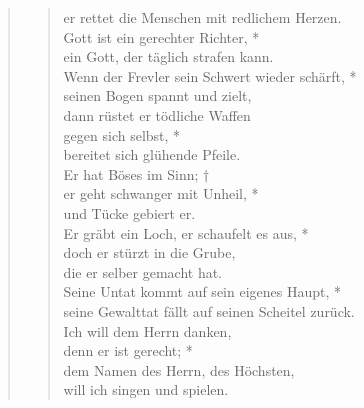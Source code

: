 \begin{quote}
\begin{verse}
er rettet die Menschen mit redlichem Herzen.\\
\vin Gott ist ein gerechter Richter, *\\
\vin ein Gott, der täglich strafen kann.\\
Wenn der Frevler sein Schwert wieder schärft, *\\
seinen Bogen spannt und zielt,\\
\vin dann rüstet er tödliche Waffen\\ 
\vin gegen sich selbst, *\\
\vin bereitet sich glühende Pfeile.\\
Er hat Böses im Sinn; †\\
er geht schwanger mit Unheil, *\\
und Tücke gebiert er.\\
\vin Er gräbt ein Loch, er schaufelt es aus, *\\
\vin doch er stürzt in die Grube,\\ 
\vin die er selber gemacht hat.\\
Seine Untat kommt auf sein eigenes Haupt, *\\
seine Gewalttat fällt auf seinen Scheitel zurück.\\
\vin Ich will dem Herrn danken,\\ 
\vin denn er ist gerecht; *\\
\vin dem Namen des Herrn, des Höchsten, \\ 
\vin will ich singen und spielen.

\end{verse}

\begin{verse}


\smallskip


\end{verse}
\end{quote}
